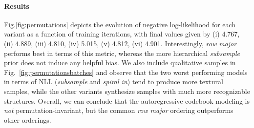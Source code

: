 \documentclass[final]{cvpr}
\begin{document}
%
\paragraph{Results} Fig.\ref{fig:permutations} depicts the evolution of negative log-likelihood for
each variant as a function of training iterations, with final values given by
(i) 4.767, (ii) 4.889, (iii) 4.810, (iv) 5.015, (v) 4.812, (vi) 4.901.
Interestingly, \emph{row major} performs best in terms of this metric, whereas the more hierarchical
\emph{subsample} prior does not induce any helpful bias.
%
We also include qualitative samples in Fig.~\ref{fig:permutationsbatches} and
observe that the two worst performing models in terms of NLL (\emph{subsample} and \emph{spiral in}) tend to produce more
textural samples, while the other variants synthesize samples with much more
recognizable structures. Overall, we can conclude that the autoregressive codebook modeling
is \emph{not} permutation-invariant, but the common \emph{row major}
ordering \cite{oord2016conditional,chen2020generative} outperforms other
orderings.

\permutations
\permuationsbatches

\newpage
\clearpage
{\small


}
\appendix
\onecolumn


\FloatBarrier
\end{document}
